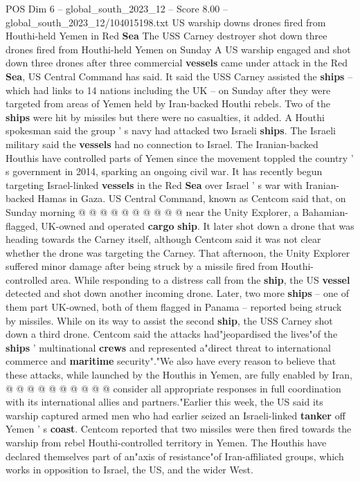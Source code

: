 \begin{textsample}{POS Dim 6 – global\_south\_2023\_12 – Score 8.00 – global\_south\_2023\_12/104015198.txt}  \label{ex:f6_pos_110}
US warship downs drones fired from Houthi-held Yemen in Red \textbf{Sea} The USS Carney destroyer shot down three drones fired from Houthi-held Yemen on Sunday A US warship engaged and shot down three drones after three commercial \textbf{vessels} came under attack in the Red \textbf{Sea}, US Central Command has said.
It said the USS Carney assisted the \textbf{ships} -- which had links to 14 nations including the UK -- on Sunday after they were targeted from areas of Yemen held by Iran-backed Houthi rebels.
Two of the \textbf{ships} were hit by missiles but there were no casualties, it added.
A Houthi spokesman said the group ' s navy had attacked two Israeli \textbf{ships}.
The Israeli military said the \textbf{vessels} had no connection to Israel.
The Iranian-backed Houthis have controlled parts of Yemen since the movement toppled the country ' s government in 2014, sparking an ongoing civil war.
It has recently begun targeting Israel-linked \textbf{vessels} in the Red \textbf{Sea} over Israel ' s war with Iranian-backed Hamas in Gaza.
US Central Command, known as Centcom said that, on Sunday morning @ @ @ @ @ @ @ @ @ @ near the Unity Explorer, a Bahamian-flagged, UK-owned and operated \textbf{cargo} \textbf{ship}.
It later shot down a drone that was heading towards the Carney itself, although Centcom said it was not clear whether the drone was targeting the Carney.
That afternoon, the Unity Explorer suffered minor damage after being struck by a missile fired from Houthi-controlled area.
While responding to a distress call from the \textbf{ship}, the US \textbf{vessel} detected and shot down another incoming drone.
Later, two more \textbf{ships} -- one of them part UK-owned, both of them flagged in Panama -- reported being struck by missiles.
While on its way to assist the second \textbf{ship}, the USS Carney shot down a third drone.
Centcom said the attacks had"jeopardised the lives"of the \textbf{ships} ' multinational \textbf{crews} and represented a"direct threat to international commerce and \textbf{maritime} security"."We also have every reason to believe that these attacks, while launched by the Houthis in Yemen, are fully enabled by Iran, @ @ @ @ @ @ @ @ @ @ consider all appropriate responses in full coordination with its international allies and partners."Earlier this week, the US said its warship captured armed men who had earlier seized an Israeli-linked \textbf{tanker} off Yemen ' s \textbf{coast}.
Centcom reported that two missiles were then fired towards the warship from rebel Houthi-controlled territory in Yemen.
The Houthis have declared themselves part of an"axis of resistance"of Iran-affiliated groups, which works in opposition to Israel, the US, and the wider West.

\end{textsample}
